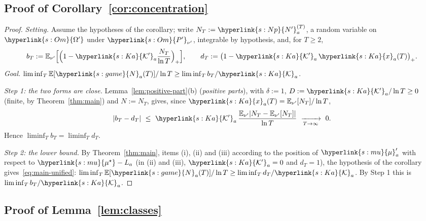 \documentclass[11pt]{article}
\newcommand{\sy}[2]{\hyperlink{#1}{#2}}
\newcommand{\E}{\mathbb{E}}
\newcommand{\mean}{\sy{s:mu}{\mu}}
\newcommand{\ms}{\sy{s:mu}{\mu^{\star}}}
\newcommand{\Om}{\sy{s:Om}{\Omega'}}
\newcommand{\Pp}{\sy{s:Om}{P'}}
\newcommand{\Np}{\sy{s:Np}{N'}}
\newcommand{\Nc}{\sy{s:game}{N}}
\newcommand{\Ka}{\sy{s:Ka}{\mathcal{K}}}
\newcommand{\Kp}{\sy{s:Ka}{\mathcal{K}'}}
\newcommand{\xr}{\sy{s:Ka}{x}}
\begin{document}
\subsection{Proof of Corollary~\ref{cor:concentration}}\label{sec:proof-concentration}

\begin{proof}
\emph{Setting.} Assume the hypotheses of the corollary; write $N_T:=\Np^{(T)}_a$, a random variable
on $\Om$ under $\Pp_{\nu'}$, integrable by hypothesis, and, for $T\ge2$,
\begin{equation*}
b_T:=\E_{\nu'}\Big[\Big(1-\Kp_a\frac{N_T}{\ln T}\Big)_+\Big],\qquad
d_T:=\big(1-\Kp_a\,\xr_a(T)\big)_+ .
\end{equation*}
\emph{Goal.} $\liminf_T\E[\Nc_a(T)]/\ln T\ge\liminf_Tb_T/\Ka_a$.

\emph{Step 1: the two forms are close.} Lemma~\ref{lem:positive-part}(b) (\emph{positive parts}),
with $\delta:=1$, $D:=\Kp_a/\ln T\ge0$ (finite, by Theorem~\ref{thm:main}) and $N:=N_T$, gives,
since $\xr_a(T)=\E_{\nu'}[N_T]/\ln T$,
\begin{equation*}
|b_T-d_T|\ \le\ \Kp_a\,\frac{\E_{\nu'}|N_T-\E_{\nu'}[N_T]|}{\ln T}\ \xrightarrow[T\to\infty]{}\ 0 .
\end{equation*}
Hence $\liminf_Tb_T=\liminf_Td_T$.

\emph{Step 2: the lower bound.} By Theorem~\ref{thm:main}, items (i), (ii) and (iii) according to
the position of $\mean'_a$ with respect to $\ms-L_a$ (in (ii) and (iii), $\Kp_a=0$ and $d_T=1$), the
hypothesis of the corollary gives~\eqref{eq:main-unified}:
$\liminf_T\E[\Nc_a(T)]/\ln T\ge\liminf_Td_T/\Ka_a$. By Step 1 this is $\liminf_Tb_T/\Ka_a$.
\end{proof}

\subsection{Proof of Lemma~\ref{lem:classes}}\label{sec:proof-classes}
\end{document}
